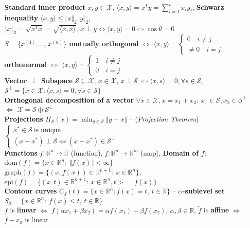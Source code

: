 \documentclass[a4paper]{article}
\begin{document}
\textbf{Standard inner product} $x, y \in \mathcal{X}$, $\langle x, y \rangle = x^T{y}=\sum_{i=1}^n{x_i y_i}$, \textbf{Schwarz inequality} $\langle x, y \rangle \le \Vert{x}\Vert_2 \Vert{y}\Vert_2$,\\
 $\Vert x \Vert_2 = \sqrt{x^T x} = \sqrt{\langle x,x \rangle}$, $x \perp y \iff \langle x,y \rangle=0 \iff \cos\theta=0$\\
 $S=\{x^{(1)}, ..., x^{(n)}\}$ \textbf{mutually orthogonal} $\iff$ $\langle{x,y}\rangle = \begin{cases}
    0 \quad i{\ne}j\\
    \ne 0 \quad i= j
 \end{cases}$ \textbf{orthonormal} $\iff$ $\langle{x,y}\rangle = \begin{cases}
    1 \quad i{\ne}j\\
     0 \quad i= j
 \end{cases}$\\
\textbf{Vector $\perp$ Subspace} $\mathcal{S}\subseteq\mathcal{X}$, $x\in\mathcal{X}$, $x\perp\mathcal{S} \ \iff \langle{x,s}\rangle=0, \forall{s}\in\mathcal{S}$, $\mathcal{S}^{\perp}=\{x\in\mathcal{X}: \langle{x,s}\rangle=0, \forall{s}\in\mathcal{S}\}$\\
 \textbf{Orthogonal decomposition of a vector} $\forall{x}\in\mathcal{X}, x=x_1+x_2: \ x_1 \in \mathcal{S}, x_2 \in \mathcal{S}^{\perp}$ $\iff$ $\mathcal{X} = \mathcal{S} \oplus \mathcal{S}^{\perp}$\\
\textbf{Projections} $\Pi_{\mathcal{S}}(x)=\min_{y\in\mathcal{S}} \Vert y-x \Vert$ -- (\textit{\textsf{Projection Theorem}})
$
\begin{cases}
    x^*\in\mathcal{S} \ \text{is unique} \\
    (x-x^*) \perp \mathcal{S} \iff (x-x^*) \in \mathcal{S}^{\perp}
\end{cases}
$\\
\textbf{Functions}  $f:\mathbb{R}^n \to \mathbb{R}$ (function), $f: \mathbb{R}^n \to \mathbb{R}^m$ (map), \textbf{Domain of $f$}: $\text{dom}(f)=\{x\in\mathbb{R}^n: \ \Vert f(x) \Vert < \infty \}$\\
$\text{graph}(f)=\{(x,f(x))\in\mathbb{R}^{n+1}: \ x\in \mathbb{R}^n\}$, $\text{epi}(f)=\{(x,t)\in\mathbb{R}^{n+1}: \ x\in\mathbb{R}^n,t>=f(x)\}$\\
\textbf{Contour curves} $C_f(t)=\{x\in \mathbb{R}^n: f(x)=t, \  t\in\mathbb{R}\}$ -- \textbf{$\alpha$-sublevel set} $S_{\alpha}=\{x\in\mathbb{R}^n: \ f(x)\le t, \ t\in \mathbb{R}\}$       \\
$f$ is \textbf{linear} $\iff$ $f(\alpha x_1 + \beta x_2) = \alpha f(x_1) + \beta f(x_2)$, $\alpha, \beta \in \mathbb{R}$, $\tilde{f}$ is \textbf{affine} $\iff$ $\tilde{f}-x_0$ is linear\\
\end{document}
